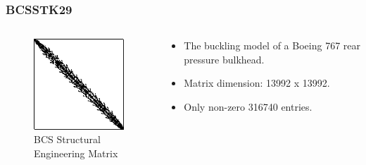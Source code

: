 \documentclass[fleqn]{beamer}
\begin{document}
\begin{frame}
\frametitle{BCSSTK29}
\begin{columns}[c]
\begin{column}{.5\textwidth}
\begin{figure}
\includegraphics[width=\textwidth]{figures/bcsstk29_sm.png}
\caption{BCS Structural Engineering Matrix}
\end{figure}
\end{column}
\begin{column}{.5\textwidth}
\begin{itemize}
\item The buckling model of a Boeing 767 rear pressure bulkhead. 
\item Matrix dimension: 13992 x 13992.
\item Only non-zero 316740 entries.
\end{itemize}
\end{column}
\end{columns}
\end{frame}
\end{document}
